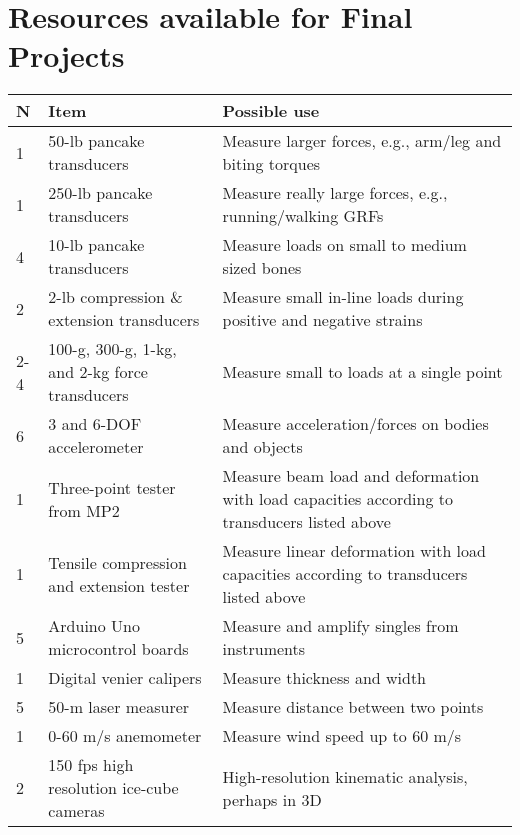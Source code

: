 \documentclass [12 pt]{article}
\begin{document}
  

\section*{Resources available for Final Projects}

\small\begin{longtable}{p{2.5cm}|p{4.5cm}|p{5cm}}
\hline 
\bf N			 & Item		&	 Possible use		\\ \hline


 1 		& 50-lb pancake transducers 					& 	Measure larger forces, e.g., arm/leg and biting torques \\ \hline
 1 		& 250-lb pancake transducers 					& 	Measure really large forces, e.g., running/walking GRFs \\ \hline
 4		& 10-lb pancake transducers 					& 	Measure loads on small to medium sized bones \\ \hline
  2		& 2-lb compression \& extension transducers		& 	Measure small in-line loads during positive and negative strains\\ \hline
  2-4		& 100-g, 300-g, 1-kg, and 2-kg force transducers	& 	Measure small to loads at a single point\\ \hline
 6		&  3 and 6-DOF accelerometer					& 	Measure acceleration/forces on bodies and objects\\ \hline
   1		& Three-point tester from MP2					& 	Measure beam load and deformation with load capacities according to transducers listed above\\ \hline
   1		& Tensile compression and extension tester		& 	Measure linear deformation with load capacities according to transducers listed above\\ \hline
  5		& Arduino Uno microcontrol boards				&	Measure and amplify singles from instruments\\ \hline
  1		& Digital venier calipers				& 	Measure thickness and width\\ \hline
   5		& 50-m laser measurer				& 	Measure distance between two points\\ \hline
  1		& 0-60 m/s anemometer						& 	Measure wind speed up to 60 m/s\\ \hline
  2 		&150 fps high resolution ice-cube cameras 		&	High-resolution kinematic analysis, perhaps in 3D\\ \hline

\end{longtable}
\end{document}
